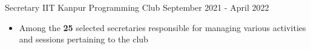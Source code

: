 \cventry
{Secretary} %
{IIT Kanpur} %
{Programming Club} %
{September 2021 - April 2022} %
{

  \begin{itemize} %
    \item Among the \textbf{25} selected secretaries responsible for managing various activities and sessions pertaining to the club
  \end{itemize}
}
